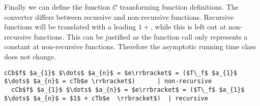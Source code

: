 Finally we can define the function $\mathcal{C}$ transforming function definitions.
The converter differs between recursive and non-recursive functions.
Recursive functions will be translated with a leading $1+$, while this is left out at non-recursive functions.
This can be justified as the function call only represents a constant at non-recursive functions.
Therefore the asymptotic running time class does not change.

\begin{lstlisting}[language=translation,caption=Conversion of functions definitions,mathescape=true,keepspaces]
  cCb$f$ $a_{1}$ $\dots$ $a_{n}$ = $e\rrbracket$ = ($T\_f$ $a_{1}$ $\dots$ $a_{n}$ = cTb$e \rrbracket$)      | non-recursive
  cCb$f$ $a_{1}$ $\dots$ $a_{n}$ = $e\rrbracket$ = ($T\_f$ $a_{1}$ $\dots$ $a_{n}$ = $1$ + cTb$e  \rrbracket$)  | recursive
\end{lstlisting}
